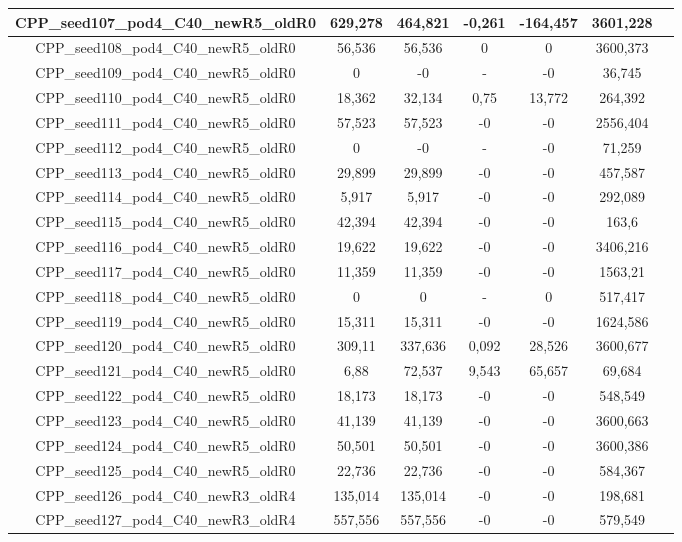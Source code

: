 \documentclass[a4paper]{article}
\begin{document}
\begin{center}
\begin{longtable}{ccccccc}
\hline
CPP\_seed107\_pod4\_C40\_newR5\_oldR0 & 629,278 & 464,821 & -0,261 & -164,457 & 3601,228\\
\hline
CPP\_seed108\_pod4\_C40\_newR5\_oldR0 & 56,536 & 56,536 & 0 & 0 & 3600,373\\
\hline
CPP\_seed109\_pod4\_C40\_newR5\_oldR0 & 0 & -0 & - & -0 & 36,745\\
\hline
CPP\_seed110\_pod4\_C40\_newR5\_oldR0 & 18,362 & 32,134 & 0,75 & 13,772 & 264,392\\
\hline
CPP\_seed111\_pod4\_C40\_newR5\_oldR0 & 57,523 & 57,523 & -0 & -0 & 2556,404\\
\hline
CPP\_seed112\_pod4\_C40\_newR5\_oldR0 & 0 & -0 & - & -0 & 71,259\\
\hline
CPP\_seed113\_pod4\_C40\_newR5\_oldR0 & 29,899 & 29,899 & -0 & -0 & 457,587\\
\hline
CPP\_seed114\_pod4\_C40\_newR5\_oldR0 & 5,917 & 5,917 & -0 & -0 & 292,089\\
\hline
CPP\_seed115\_pod4\_C40\_newR5\_oldR0 & 42,394 & 42,394 & -0 & -0 & 163,6\\
\hline
CPP\_seed116\_pod4\_C40\_newR5\_oldR0 & 19,622 & 19,622 & -0 & -0 & 3406,216\\
\hline
CPP\_seed117\_pod4\_C40\_newR5\_oldR0 & 11,359 & 11,359 & -0 & -0 & 1563,21\\
\hline
CPP\_seed118\_pod4\_C40\_newR5\_oldR0 & 0 & 0 & - & 0 & 517,417\\
\hline
CPP\_seed119\_pod4\_C40\_newR5\_oldR0 & 15,311 & 15,311 & -0 & -0 & 1624,586\\
\hline
CPP\_seed120\_pod4\_C40\_newR5\_oldR0 & 309,11 & 337,636 & 0,092 & 28,526 & 3600,677\\
\hline
CPP\_seed121\_pod4\_C40\_newR5\_oldR0 & 6,88 & 72,537 & 9,543 & 65,657 & 69,684\\
\hline
CPP\_seed122\_pod4\_C40\_newR5\_oldR0 & 18,173 & 18,173 & -0 & -0 & 548,549\\
\hline
CPP\_seed123\_pod4\_C40\_newR5\_oldR0 & 41,139 & 41,139 & -0 & -0 & 3600,663\\
\hline
CPP\_seed124\_pod4\_C40\_newR5\_oldR0 & 50,501 & 50,501 & -0 & -0 & 3600,386\\
\hline
CPP\_seed125\_pod4\_C40\_newR5\_oldR0 & 22,736 & 22,736 & -0 & -0 & 584,367\\
\hline
CPP\_seed126\_pod4\_C40\_newR3\_oldR4 & 135,014 & 135,014 & -0 & -0 & 198,681\\
\hline
CPP\_seed127\_pod4\_C40\_newR3\_oldR4 & 557,556 & 557,556 & -0 & -0 & 579,549\\

\end{longtable}
\end{center}
\end{document}
